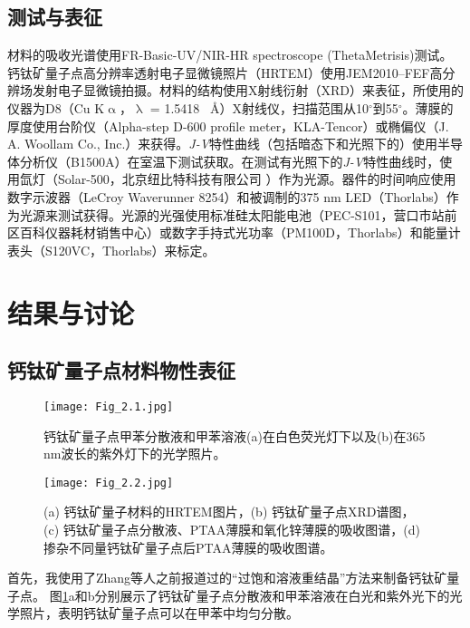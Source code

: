 \documentclass[forlib]{WHUMaster}   %
\def\degree{${}^{\circ}$} %
\begin{document}
{\subsection{测试与表征}

材料的吸收光谱使用FR-Basic-UV/NIR-HR spectroscope (ThetaMetrisis)测试。钙钛矿量子点高分辨率透射电子显微镜照片（HRTEM）使用JEM2010--FEF高分辨场发射电子显微镜拍摄。材料的结构使用X射线衍射（XRD）来表征，所使用的仪器为D8（Cu K$\upalpha$，$\uplambda$ = 1.5418 \ {\AA}）X射线仪，扫描范围从10{\degree}到55{\degree}。薄膜的厚度使用台阶仪（Alpha-step D-600 profile meter，KLA-Tencor）或椭偏仪（J. A. Woollam Co., Inc.）来获得。\emph{J-V}特性曲线（包括暗态下和光照下的）使用半导体分析仪（B1500A）在室温下测试获取。在测试有光照下的\emph{J-V}特性曲线时，使用氙灯（Solar-500，北京纽比特科技有限公司 ）作为光源。器件的时间响应使用数字示波器（LeCroy Waverunner 8254）和被调制的375 nm LED（Thorlabs）作为光源来测试获得。光源的光强使用标准硅太阳能电池（PEC-S101，营口市站前区百科仪器耗材销售中心）或数字手持式光功率（PM100D，Thorlabs）和能量计表头（S120VC，Thorlabs）来标定。

\section{结果与讨论}

\subsection{\texorpdfstring{{}钙钛矿量子点材料物性表征}{PDFstring}}

\begin{figure}
\centering
  \texttt{[image: Fig\_2.1.jpg]}
  \caption{\rm {}钙钛矿量子点甲苯分散液和甲苯溶液(a)在白色荧光灯下以及(b)在365 nm波长的紫外灯下的光学照片。}
  \label{fig:2.1}
\end{figure}

\begin{figure}
\centering
  \texttt{[image: Fig\_2.2.jpg]}
  \caption{\rm (a) 钙钛矿量子材料的HRTEM图片，(b) 钙钛矿量子点XRD谱图，(c) 钙钛矿量子点分散液、PTAA薄膜和氧化锌薄膜的吸收图谱，(d) 掺杂不同量钙钛矿量子点后PTAA薄膜的吸收图谱。}
  \label{fig:2.2}
\end{figure}

首先，我使用了Zhang等人之前报道过的“过饱和溶液重结晶”方法来制备钙钛矿量子点\cite{RN10}。 图\ref{fig:2.1}a和b分别展示了钙钛矿量子点分散液和甲苯溶液在白光和紫外光下的光学照片，表明钙钛矿量子点可以在甲苯中均匀分散。

}
\end{document}
